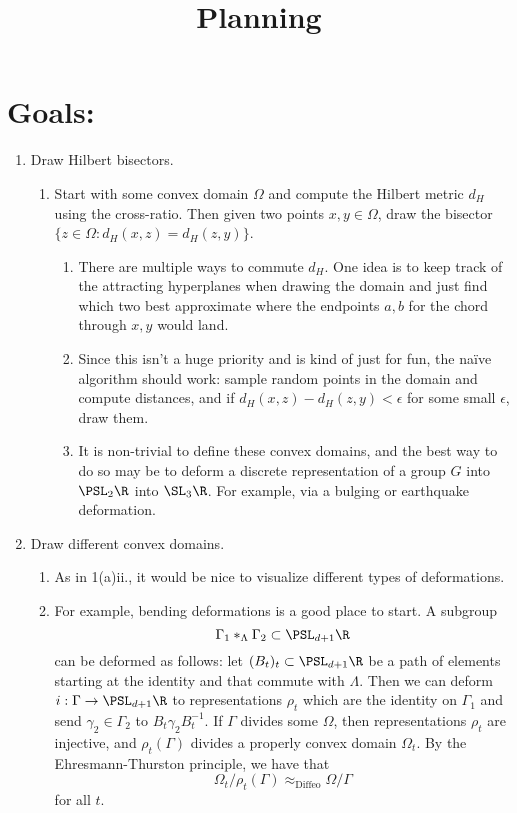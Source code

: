 \documentclass[12pt]{article}%
\begin{document}
\title{Planning}
\maketitle

\section*{Goals:}
\begin{enumerate}
	\item Draw Hilbert bisectors.
	\begin{enumerate}
		\item Start with some convex domain $\Omega$ and compute the Hilbert metric $d_H$ using the cross-ratio. Then given two points $x,y \in \Omega$, draw the bisector $\{z \in \Omega : d_H(x,z) = d_H(z,y)\}$.
		\begin{enumerate}
			\item There are multiple ways to commute $d_H$. One idea is to keep track of the attracting hyperplanes when drawing the domain and just find which two best approximate where the endpoints $a,b$ for the chord through $x,y$ would land.
			\item Since this isn't a huge priority and is kind of just for fun, the na\"ive algorithm should work: sample random points in the domain and compute distances, and if $d_H(x,z) - d_H(z,y) < \epsilon$ for some small $\epsilon$, draw them.
			\item It is non-trivial to define these convex domains, and the best way to do so may be to deform a discrete representation of a group $G$ into $\PSL_2\R$ into $\SL_3\R$. For example, via a bulging or earthquake deformation.
		\end{enumerate}
	\end{enumerate}
	\item Draw different convex domains.
	\begin{enumerate}
		\item As in 1(a)ii., it would be nice to visualize different types of deformations.
		\item For example, bending deformations is a good place to start. A subgroup \[\Gamma_1 *_\Lambda \Gamma_2 \subset \PSL_{d + 1}\R\] can be deformed as follows: let $(B_t)_t \subset \PSL_{d + 1}\R$ be a path of elements starting at the identity and that commute with $\Lambda$. Then we can deform $i: \Gamma \to \PSL_{d + 1}\R$ to representations $\rho_t$ which are the identity on $\Gamma_1$ and send $\gamma_2 \in \Gamma_2$ to $B_t\gamma_2B_t^{-1}$. If $\Gamma$ divides some $\Omega$, then representations $\rho_t$ are injective, and $\rho_t(\Gamma)$ divides a properly convex domain $\Omega_t$. By the Ehresmann-Thurston principle, we have that \[\Omega_t/\rho_t(\Gamma) \approx_{\text{Diffeo}} \Omega/\Gamma\] for all $t$.


\end{enumerate}
\end{enumerate}
\end{document}
